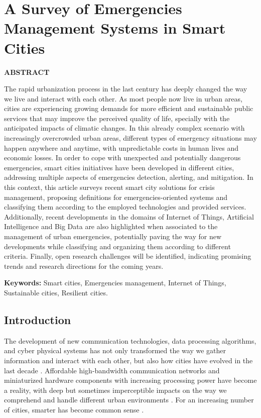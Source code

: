 \chapter{A Survey of Emergencies Management Systems in Smart Cities}
\label{cap:survey}

\begin{refsection}

\textbf{ABSTRACT}

The rapid urbanization process in the last century has deeply changed the way we live and interact with each other. As most people now live in urban areas, cities are experiencing growing demands for more efficient and sustainable public services that may improve the perceived quality of life, specially with the anticipated impacts of climatic changes. In this already complex scenario with increasingly overcrowded urban areas, different types of emergency situations may happen anywhere and anytime, with unpredictable costs in human lives and economic losses. In order to cope with unexpected and potentially dangerous emergencies, smart cities initiatives have been developed in different cities, addressing multiple aspects of emergencies detection, alerting, and mitigation. In this context, this article surveys recent smart city solutions for crisis management, proposing definitions for emergencies-oriented systems and classifying them according to the employed technologies and provided services. Additionally, recent developments in the domains of Internet of Things, Artificial Intelligence and Big Data are also highlighted when associated to the management of urban emergencies, potentially paving the way for new developments while classifying and organizing them according to different criteria. Finally, open research challenges will be identified, indicating promising trends and research directions for the coming years.

\textbf{Keywords:} Smart cities, Emergencies management, Internet of Things, Sustainable cities, Resilient cities.

\section{Introduction}

The development of new communication technologies, data processing algorithms, and cyber physical systems has not only transformed the way we gather information and interact with each other, but also how cities have evolved in the last decade \cite{smartcities1,smartcities7}. Affordable high-bandwidth communication networks and miniaturized hardware components with increasing processing power have become a reality, with deep but sometimes imperceptible impacts on the way we comprehend and handle different urban environments \cite{smartcities2,smartcities3}. For an increasing number of cities, smarter has become common sense \cite{smartcities8}.


\end{refsection}
